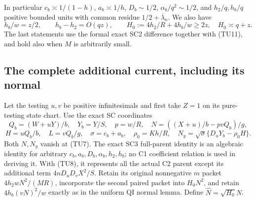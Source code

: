 In particular $c_b\asymp1/(1-h)$, $a_b\asymp1/h$,
$D_b\sim1/2$, $\alpha_b/q^2\sim1/2$, and
$h_2/q,h_b/q$ positive bounded units with common residue
$1/2+\overline\lambda_n$.  We also have
\[
 h_b/w=z/2,\qquad h_b-h_2=O(qz),\qquad
 H_0:=4h_2/R+4h_b/w\geq2z,
 \quad H_0\asymp q+z.                                  \tag{TU13}
\]
The last statements use the formal exact SC2 difference together
with (TU11), and hold also when $M$ is arbitrarily small.

\subsection{The complete additional current, including its normal}

Let the testing $u,v$ be positive infinitesimals and first take
$Z=1$ on its pure-testing state chart.  Use the exact SC coordinates
\[
 Q_b=(W+uY)/b,\quad Y_b=Y/S,\quad p=w/R,\quad
 N=((X+u)/b-pvQ_b)/g,
\]
\[
 H=uQ_b/b,\quad L=vQ_b/g,\quad
 \sigma=c_b+a_b,\quad \rho_0=Kh/R,\quad
 N_y=\sqrt\sigma\{D_uY_b-\rho_0H\}.
                                                               \tag{TU14}
\]
Both $N,N_y$ vanish at (TU7).  The exact SC3 full-parent identity
is an algebraic identity for arbitrary $c_b,a_b,D_b,\alpha_b,h_2,h_b$;
no C1 coefficient relation is used in deriving it.  With (TU8),
it represents all the actual C2 parent except its additional term
$4nD_uD_vX^2/S$.  Retain its original nonnegative $m$ packet
$4h_2wN^2/(MR)$, incorporate the second paired packet into
$H_0N^2$, and retain $4h_b(vN)^2/w$ exactly as in the uniform
QI normal lemma.  Define $\widehat N=\sqrt{H_0}N$.

